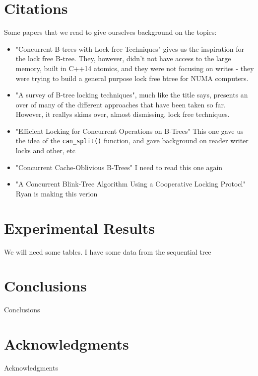 \documentclass{sig-alternate}
\begin{document}
\section{Citations}
Some papers that we read to give ourselves background on the topics:
\begin{itemize}
  \item "Concurrent B-trees with Lock-free Techniques"\cite{sultana:lockfree} gives us the inspiration for the lock free B-tree.  They, however, didn't not have access to the large memory, built in C++14 atomics, and they were not focusing on writes - they were trying to build a general purpose lock free btree for NUMA computers.
  \item "A survey of B-tree locking techniques"\cite{graefe:survey}, much like the title says, presents an over of many of the different approaches that have been taken so far.  However, it reallys skims over, almost dismissing, lock free techniques.
  \item "Efficient Locking for Concurrent Operations on B-Trees" \cite{lehman:locking} This one gave us the idea of the \texttt{can\_split()} function, and gave background on reader writer locks and other, etc
  \item "Concurrent Cache-Oblivious B-Trees" \cite{bender:cache} I need to read this one again
  \item "A Concurrent Blink-Tree Algorithm Using a Cooperative Locking Protocl" \cite{lim:blink} Ryan is making this verion
\end{itemize}

\section{Experimental Results}
We will need some tables.  I have some data from the sequential tree

\section{Conclusions}
Conclusions

\section{Acknowledgments}
Acknowledgments



\end{document}
